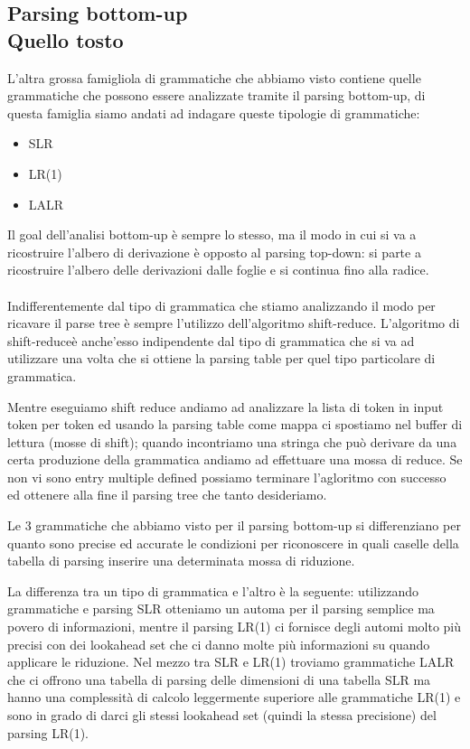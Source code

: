 \documentclass[class=book, crop=false, oneside, 12pt]{standalone}
\begin{document}
\subsection{Parsing bottom-up\\ \small{Quello tosto}}
L'altra grossa famigliola di grammatiche che abbiamo visto contiene quelle grammatiche che possono essere analizzate tramite il parsing bottom-up, di questa famiglia siamo andati ad indagare queste tipologie di grammatiche:
\begin{itemize}
    \item SLR
    \item LR(1)
    \item LALR
\end{itemize}
Il goal dell'analisi bottom-up è sempre lo stesso, ma il modo in cui si va a ricostruire l'albero di derivazione è opposto al parsing top-down: si parte a ricostruire l'albero delle derivazioni dalle foglie e si continua fino alla radice.
\\\\
Indifferentemente dal tipo di grammatica che stiamo analizzando il modo per ricavare il parse tree è sempre l'utilizzo dell'algoritmo shift-reduce.
L'algoritmo di shift-reduceè anche'esso indipendente dal tipo di grammatica che si va ad utilizzare una volta che si ottiene la parsing table per quel tipo particolare di grammatica.

Mentre eseguiamo shift reduce andiamo ad analizzare la lista di token in input token per token ed usando la parsing table come mappa ci spostiamo nel buffer di lettura (mosse di shift); quando incontriamo una stringa che può derivare da una certa produzione della grammatica andiamo ad effettuare una mossa di reduce.
Se non vi sono entry multiple defined possiamo terminare l'agloritmo con successo ed ottenere alla fine il parsing tree che tanto desideriamo.

Le 3 grammatiche che abbiamo visto per il parsing bottom-up si differenziano per quanto sono precise ed accurate le condizioni per riconoscere in quali caselle della tabella di parsing inserire una determinata mossa di riduzione.

La differenza tra un tipo di grammatica e l'altro è la seguente: utilizzando grammatiche e parsing SLR otteniamo un automa per il parsing semplice ma povero di informazioni, mentre il parsing LR(1) ci fornisce degli automi molto più precisi con dei lookahead set che ci danno molte più informazioni su quando applicare le riduzione.
Nel mezzo tra SLR e LR(1) troviamo grammatiche LALR che ci offrono una tabella di parsing delle dimensioni di una tabella SLR ma hanno una complessità di calcolo leggermente superiore alle grammatiche LR(1) e sono in grado di darci gli stessi lookahead set (quindi la stessa precisione) del parsing LR(1).
\end{document}
